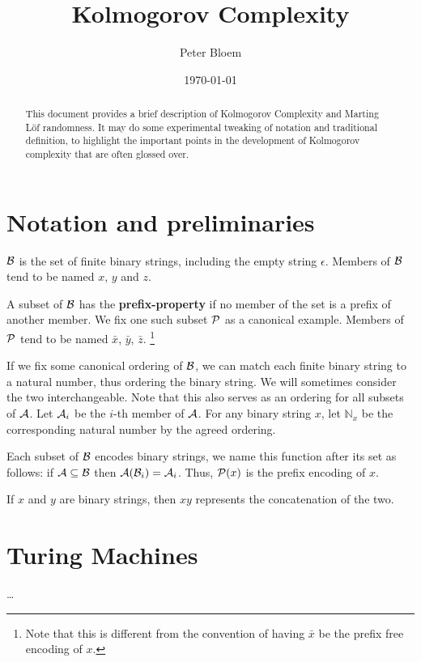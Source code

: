 \documentclass{article}
\title{Kolmogorov Complexity}
\date{\today}
\author{Peter Bloem}
\theoremstyle{definition}
\begin{document}
\maketitle

\begin{abstract}
\noindent This document provides a brief description of Kolmogorov Complexity and Marting L\"of randomness. It may do some experimental tweaking of notation and traditional definition, to highlight the important points in the development of Kolmogorov complexity that are often glossed over.
\end{abstract}

\section*{Notation and preliminaries}

$\cal{B}$ is the set of finite binary strings, including the empty string $\epsilon$. Members of $\cal B$ tend to be named $x$, $y$ and $z$.

A subset of $\cal B$ has the \textbf{prefix-property} if no member of the set is a prefix of another member. We fix one such subset $\cal P$ as a canonical example. Members of $\cal{P}$ tend to be named $\bar{x}$, $\bar{y}$, $\bar{z}$. \footnote{Note that this is different from the convention of having $\bar{x}$ be the prefix free encoding of $x$.} 

If we fix some canonical ordering of $\cal B$, we can match each finite binary string to a natural number, thus ordering the binary string. We will sometimes consider the two interchangeable. Note that this also serves as an ordering for all subsets of $\cal A$. Let ${\cal A}_i$ be the $i$-th member of $\cal A$. For any binary string $x$, let ${\mathbb N}_x$ be the corresponding natural number by the agreed ordering.

Each subset of $\cal{B}$ encodes binary strings, we name this function after its set as follows: if ${\cal A} \subseteq {\cal B}$ then ${\cal A}({\cal B}_i) = {\cal A}_i$. Thus, ${\cal P}(x)$ is the prefix encoding of $x$.

If $x$ and $y$ are binary strings, then $xy$ represents the concatenation of the two.

\section*{Turing Machines}

\ldots
\end{document}
